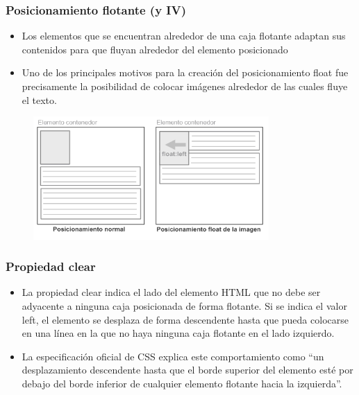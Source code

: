 
\begin{frame}
\frametitle{Posicionamiento flotante (y IV)}

\begin{itemize}
  \item Los elementos que se encuentran alrededor de una caja flotante adaptan sus contenidos para que fluyan alrededor del elemento posicionado
  \item Uno de los principales motivos para la creación del posicionamiento float fue precisamente la posibilidad de colocar imágenes alrededor de las cuales fluye el texto.
\end{itemize}


\begin{center}
\begin{figure}[p]
\includegraphics[width=0.8\textwidth]{figs/f0513.png}
\end{figure}
\end{center}

\end{frame}



\begin{frame}
\frametitle{Propiedad clear}

\begin{itemize}
  \item La propiedad clear indica el lado del elemento HTML que no debe ser adyacente a ninguna caja posicionada de forma flotante. Si se indica el valor left, el elemento se desplaza de forma descendente hasta que pueda colocarse en una línea en la que no haya ninguna caja flotante en el lado izquierdo.
  \item La especificación oficial de CSS explica este comportamiento como ``un desplazamiento descendente hasta que el borde superior del elemento esté por debajo del borde inferior de cualquier elemento flotante hacia la izquierda''.
\end{itemize}

\end{frame}



